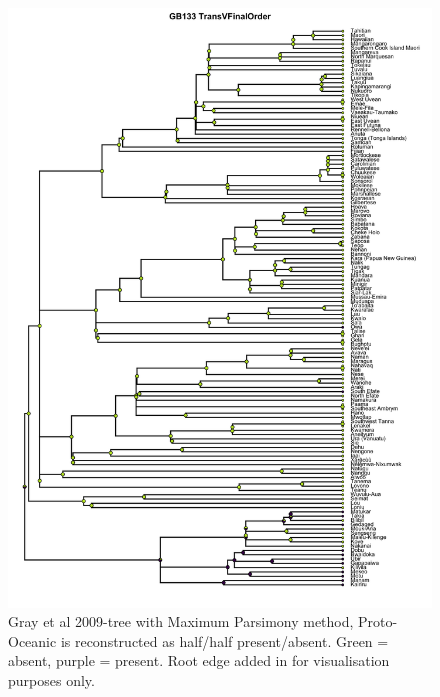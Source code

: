 \documentclass[12pt,letterpaper]{article}
\begin{document}
\begin{figure}[ht]
\centering
\includegraphics[width=14cm]{illustrations/plots_from_R/tree_plots/gray_et_al_2009/parsimony/parsimony_gray_tree_mcct_GB133.png}
\caption{Gray et al 2009-tree with Maximum Parsimony method, Proto-Oceanic is reconstructed as half/half present/absent. Green = absent, purple = present. Root edge added in for visualisation purposes only.}
\label{fig:parsimony_gray_mcct}
\end{figure}
\end{document}
